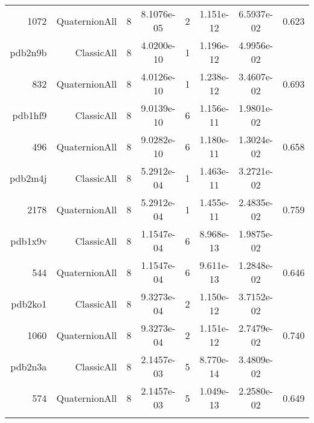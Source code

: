 \begin{xltabular}{\textwidth}{r|rcS[table-format=1.4e+2]cS[table-format=1.3e+2]S[table-format=1.4e+2]S[table-format=-1.3]}
1072 & QuaternionAll & 8 & 8.1076e-05 & 2 & 1.151e-12 & 6.5937e-02 & 0.623\\  \addlinespace
pdb2n9b & ClassicAll & 8 & 4.0200e-10 & 1 & 1.196e-12 & 4.9956e-02 & \\
832 & QuaternionAll & 8 & 4.0126e-10 & 1 & 1.238e-12 & 3.4607e-02 & 0.693\\  \addlinespace
pdb1hf9 & ClassicAll & 8 & 9.0139e-10 & 6 & 1.156e-11 & 1.9801e-02 & \\
496 & QuaternionAll & 8 & 9.0282e-10 & 6 & 1.180e-11 & 1.3024e-02 & 0.658\\  \addlinespace
pdb2m4j & ClassicAll & 8 & 5.2912e-04 & 1 & 1.463e-11 & 3.2721e-02 & \\
2178 & QuaternionAll & 8 & 5.2912e-04 & 1 & 1.455e-11 & 2.4835e-02 & 0.759\\  \addlinespace
pdb1x9v & ClassicAll & 8 & 1.1547e-04 & 6 & 8.968e-13 & 1.9875e-02 & \\
544 & QuaternionAll & 8 & 1.1547e-04 & 6 & 9.611e-13 & 1.2848e-02 & 0.646\\  \addlinespace
pdb2ko1 & ClassicAll & 8 & 9.3273e-04 & 2 & 1.150e-12 & 3.7152e-02 & \\
1060 & QuaternionAll & 8 & 9.3273e-04 & 2 & 1.151e-12 & 2.7479e-02 & 0.740\\  \addlinespace
pdb2n3a & ClassicAll & 8 & 2.1457e-03 & 5 & 8.770e-14 & 3.4809e-02 & \\
574 & QuaternionAll & 8 & 2.1457e-03 & 5 & 1.049e-13 & 2.2580e-02 & 0.649\\  \addlinespace
\end{xltabular}
